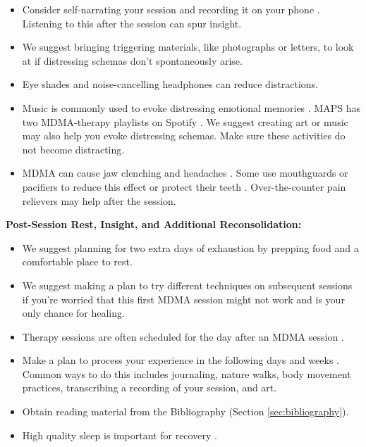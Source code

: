 \documentclass[12pt,letterpaper]{article}
\begin{document}
\begin{itemize}
    \item Consider self-narrating your session and recording it on your phone \cite{mithoeferManual}. Listening to this after the session can spur insight.
    \item We suggest bringing triggering materials, like photographs or letters, to look at if distressing schemas don't spontaneously arise. 
    \item Eye shades and noise-cancelling headphones can reduce distractions.
    \item Music is commonly used to evoke distressing emotional memories \cite{mithoeferManual}. MAPS has two MDMA-therapy playlists on Spotify \cite{mapsMusicA,mapsMusicB}. We suggest creating art or music may also help you evoke distressing schemas. Make sure these activities do not become distracting.
    \item MDMA can cause jaw clenching and headaches \cite{mitchellMDMAClinicalTrial2,liechtiGender}. Some use mouthguards or pacifiers to reduce this effect or protect their teeth \cite{emdeEmergency}. Over-the-counter pain relievers may help after the session. 
\end{itemize}
\noindent \textbf{Post-Session Rest, Insight, and Additional Reconsolidation:}
\begin{itemize}
    \item We suggest planning for two extra days of exhaustion by prepping food and a comfortable place to rest. 
    \item We suggest making a plan to try different techniques on subsequent sessions if you're worried that this first MDMA session might not work and is your only chance for healing.
    \item Therapy sessions are often scheduled for the day after an MDMA session \cite{mithoeferManual}. 
    \item Make a plan to process your experience in the following days and weeks \cite{mithoeferManual}. Common ways to do this includes journaling, nature walks, body movement practices, transcribing a recording of your session, and art. 
    \item Obtain reading material from the Bibliography (Section \ref{sec:bibliography}).
    \item High quality sleep is important for recovery \cite{walkerSleep}. 
\end{itemize}
\end{document}
